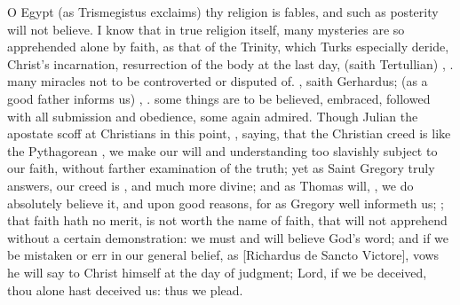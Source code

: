 {O Egypt (as Trismegistus exclaims) thy religion is fables, and
such as posterity will not believe. I know that in true religion
itself, many mysteries are so apprehended alone by faith, as that of
the Trinity, which Turks especially deride, Christ's incarnation,
resurrection of the body at the last day,  (saith
Tertullian) , \etc{}. many miracles not to be controverted
or disputed of. , saith
Gerhardus;  (as a good father informs us) , \etc{}. some things are to be believed,
embraced, followed with all submission and obedience, some again
admired. Though Julian the apostate scoff at Christians in this point,
, saying, that the
Christian creed is like the Pythagorean , we make our will
and understanding too slavishly subject to our faith, without farther
examination of the truth; yet as Saint Gregory truly answers, our creed
is , and much more divine; and as Thomas will, , we do absolutely believe it, and upon good
reasons, for as Gregory well informeth us; ; that faith hath no merit, is not
worth the name of faith, that will not apprehend without a certain
demonstration: we must and will believe God's word; and if we be
mistaken or err in our general belief, as [\textlatin{Richardus de Sancto
Victore}], vows he will say to Christ himself at the day of judgment;
Lord, if we be deceived, thou alone hast deceived us: thus we plead.

}
